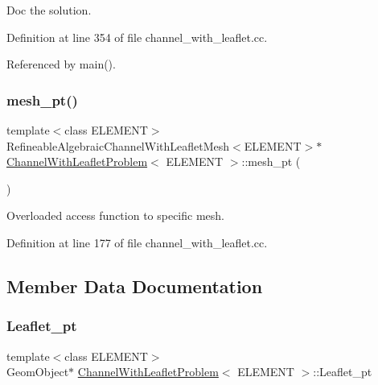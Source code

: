Doc the solution. 



Definition at line 354 of file channel\+\_\+with\+\_\+leaflet.\+cc.



Referenced by main().

\mbox{\label{classChannelWithLeafletProblem_a023dc7718a98f820e4bc4541150a0c08}} 
\subsubsection{\texorpdfstring{mesh\+\_\+pt()}{mesh\_pt()}}
{\footnotesize\ttfamily template$<$class E\+L\+E\+M\+E\+NT$>$ \\
Refineable\+Algebraic\+Channel\+With\+Leaflet\+Mesh$<$E\+L\+E\+M\+E\+NT$>$$\ast$ \hyperlink{classChannelWithLeafletProblem}{Channel\+With\+Leaflet\+Problem}$<$ E\+L\+E\+M\+E\+NT $>$\+::mesh\+\_\+pt (\begin{DoxyParamCaption}{ }\end{DoxyParamCaption})\hspace{0.3cm}{\ttfamily [inline]}}



Overloaded access function to specific mesh. 



Definition at line 177 of file channel\+\_\+with\+\_\+leaflet.\+cc.



\subsection{Member Data Documentation}
\mbox{\label{classChannelWithLeafletProblem_ac32f0451749ec4e85d39246f5823a5f2}} 
\subsubsection{\texorpdfstring{Leaflet\+\_\+pt}{Leaflet\_pt}}
{\footnotesize\ttfamily template$<$class E\+L\+E\+M\+E\+NT$>$ \\
Geom\+Object$\ast$ \hyperlink{classChannelWithLeafletProblem}{Channel\+With\+Leaflet\+Problem}$<$ E\+L\+E\+M\+E\+NT $>$\+::Leaflet\+\_\+pt\hspace{0.3cm}{\ttfamily [private]}}



